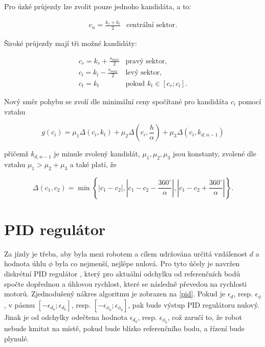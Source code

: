 \documentclass[twoside]{ctuthesis}
\theoremstyle{plain}
\theoremstyle{definition}
\theoremstyle{note}
\begin{document}
Pro úzké průjezdy lze zvolit pouze jednoho kandidáta, a to:

\begin{equation}
\begin{array}{ll}
c_n = \frac{k_r + k_l}{2}&\textrm{centrální sektor}.
\end{array}
\end{equation}

Široké průjezdy mají tři možné kandidáty:

\begin{equation}
\begin{array}{ll}
c_r = k_r + \frac{s_{max}}{2}&\textrm{pravý sektor,}\\

c_l = k_l - \frac{s_{max}}{2}&\textrm{levý sektor,}\\

c_t = k_t&\textrm{pokud $k_t \in \left[c_r;c_l\right]$}.
\end{array}
\end{equation}

Nový směr pohybu se zvolí dle minimální ceny spočítané pro kandidáta $c_i$ pomocí vztahu \cite{cite:13}

\begin{equation}
g(c_i) = \mu_1 \Delta\left(c_i, k_t\right) + \mu_2\Delta\left(c_i, \frac{h}{\alpha}\right) + \mu_3\Delta\left(c_i, k_{d, n-1}\right)
\end{equation}

přičemž $k_{d, n-1}$ je minule zvolený kandidát,
$\mu_1, \mu_2, \mu_3$ jsou konstanty, zvolené dle vztahu $\mu_1 > \mu_2 + \mu_3$ a také platí, že

\begin{equation}
\Delta(c_1, c_2) = \min\left\{|c_1 - c_2|, |c_1 - c_2 - \frac{360^{\circ}}{\alpha}|, |c_1 - c_2 + \frac{360^{\circ}}{\alpha}|\right\}.
\end{equation}


\section{PID regulátor}


Za jízdy je třeba, aby byla mezi robotem a cílem udržována určitá vzdálenost $d$ a hodnota úhlu $\phi$ byla co nejmenší, nejlépe nulová. Pro tyto účely je navržen diskrétní PID regulátor  \cite{cite:14}, který pro aktuální odchylku od referenčních bodů spočte dopřednou a úhlovou rychlost, které se následně převedou na rychlosti motorů. Zjednodušený nákres algoritmu je zobrazen na \ref{pid}.  Pokud je $\epsilon_d$, resp. $\epsilon_\phi$, v pásmu $\left[-\epsilon_{d_0}; \epsilon_{d_0}\right]$, resp. $\left[-\epsilon_{\phi_0}; \epsilon_{\phi_0}\right]$, pak bude výstup PID regulátoru nulový. Jinak je od odchylky odečtena hodnota $\epsilon_{d_0}$, resp. $\epsilon_{\phi_0}$, což zaručí to, že robot nebude kmitat na místě, pokud bude blízko referenčního bodu, a řízení bude plynulé.
\end{document}
